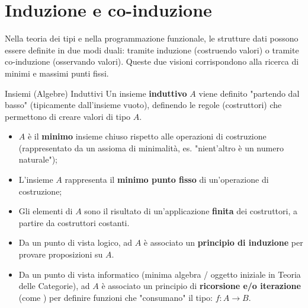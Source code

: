 \section{Induzione e co-induzione}

Nella teoria dei tipi e nella programmazione funzionale, le strutture dati possono essere definite in due modi duali: tramite induzione (costruendo valori) o tramite co-induzione (osservando valori). Queste due visioni corrispondono alla ricerca di minimi e massimi punti fissi.

\begin{defframe}{Insiemi (Algebre) Induttivi}{}
    Un insieme \textbf{induttivo} $A$ viene definito "partendo dal basso" (tipicamente dall'insieme vuoto), definendo le regole (costruttori) che permettono di creare valori di tipo $A$.
    
    \begin{itemize}
        \item $A$ è il \textbf{minimo} insieme chiuso rispetto alle operazioni di costruzione (rappresentato da un assioma di minimalità, es. "nient'altro è un numero naturale");
        \item L'insieme $A$ rappresenta il \textbf{minimo punto fisso} di un'operazione di costruzione;
        \item Gli elementi di $A$ sono il risultato di un'applicazione \textbf{finita} dei costruttori, a partire da costruttori costanti.
            \item Da un punto di vista logico, ad $A$ è associato un \textbf{principio di induzione} per provare proposizioni su $A$.
            \item Da un punto di vista informatico (minima algebra / oggetto iniziale in Teoria delle Categorie), ad $A$ è associato un principio di \textbf{ricorsione e/o iterazione} (come ) per definire funzioni che "consumano" il tipo: $f \colon A \to B$.
    \end{itemize}
\end{defframe}


